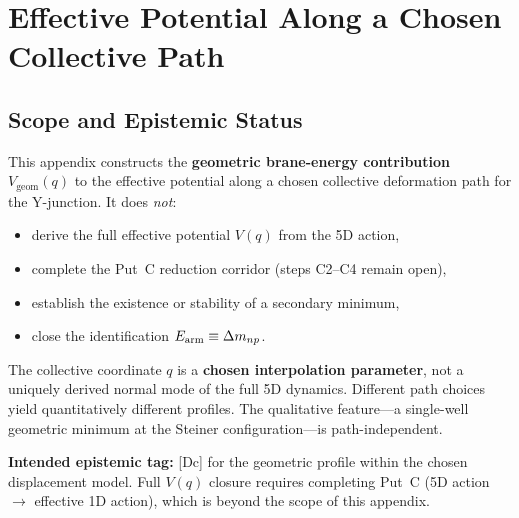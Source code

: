 
\chapter{Effective Potential Along a Chosen Collective Path}
\label{app:vq_chosen_path}

\section*{Scope and Epistemic Status}

This appendix constructs the \textbf{geometric brane-energy contribution}
$V_{\mathrm{geom}}(q)$ to the effective potential along a chosen collective
deformation path for the Y-junction. It does \emph{not}:
\begin{itemize}
    \item derive the full effective potential $V(q)$ from the 5D action,
    \item complete the Put~C reduction corridor (steps C2--C4 remain open),
    \item establish the existence or stability of a secondary minimum,
    \item close the identification $E_{\text{arm}} \equiv \Delta m_{np}$.
\end{itemize}

The collective coordinate $q$ is a \textbf{chosen interpolation parameter},
not a uniquely derived normal mode of the full 5D dynamics. Different path
choices yield quantitatively different profiles. The qualitative feature---a
single-well geometric minimum at the Steiner configuration---is
path-independent.

\textbf{Intended epistemic tag:} [Dc] for the geometric profile within the
chosen displacement model. Full $V(q)$ closure requires completing Put~C
(5D action $\to$ effective 1D action), which is beyond the scope of this
appendix.

